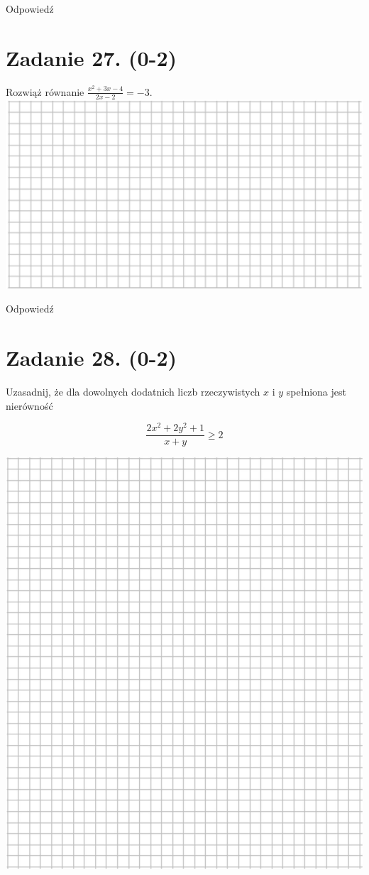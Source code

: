\documentclass[10pt]{article}
\begin{document}
Odpowiedź

\section*{Zadanie 27. (0-2)}
Rozwiąż równanie \(\frac{x^{2}+3 x-4}{2 x-2}=-3\).\\
\includegraphics[max width=\textwidth, center]{2024_11_21_ba65d61981011633d840g-11}

Odpowiedź \(\qquad\)

\section*{Zadanie 28. (0-2)}
Uzasadnij, że dla dowolnych dodatnich liczb rzeczywistych \(x\) i \(y\) spełniona jest nierówność

\[
\frac{2 x^{2}+2 y^{2}+1}{x+y} \geq 2
\]

\begin{center}
\includegraphics[max width=\textwidth]{2024_11_21_ba65d61981011633d840g-12}
\end{center}
\end{document}
